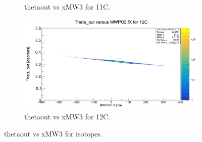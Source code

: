 \documentclass[12pt, letterpaper]{article}
\begin{document}
\begin{figure}[!htbp]
\begin{subfigure}{.5\textwidth}
  \caption{theta\textunderscore out vs xMW3 for 11C.}
  \label{fig:sub-second}
\end{subfigure}
\begin{subfigure}{.5\textwidth}
  \centering
  \includegraphics[width=.9\linewidth]{theta_out_fit12C.png} 
  \caption{theta\textunderscore out vs xMW3 for 12C.}
  \label{fig:sub-second}
\end{subfigure}
\caption{theta\textunderscore out vs xMW3 for isotopes.}
\label{fig:iso_fit}
\end{figure}
\end{document}
